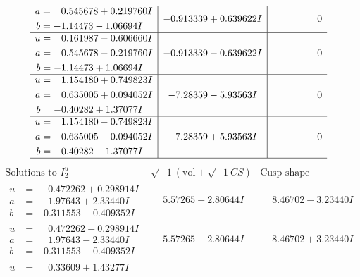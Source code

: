\documentclass[1p]{elsarticle_modified}
\theoremstyle{definition}
\newcommand{\I}{\sqrt{-1}}
\begin{document}
$$\begin{array}{c|c|c}
\begin{aligned}
a &= \phantom{-}0.545678 + 0.219760 I \\
b &= -1.14473 - 1.06694 I\end{aligned}
 & -0.913339 + 0.639622 I & \phantom{-0.000000 } 0 \\ \hline\begin{aligned}
u &= \phantom{-}0.161987 - 0.606660 I \\
a &= \phantom{-}0.545678 - 0.219760 I \\
b &= -1.14473 + 1.06694 I\end{aligned}
 & -0.913339 - 0.639622 I & \phantom{-0.000000 } 0 \\ \hline\begin{aligned}
u &= \phantom{-}1.154180 + 0.749823 I \\
a &= \phantom{-}0.635005 + 0.094052 I \\
b &= -0.40282 + 1.37077 I\end{aligned}
 & -7.28359 - 5.93563 I & \phantom{-0.000000 } 0 \\ \hline\begin{aligned}
u &= \phantom{-}1.154180 - 0.749823 I \\
a &= \phantom{-}0.635005 - 0.094052 I \\
b &= -0.40282 - 1.37077 I\end{aligned}
 & -7.28359 + 5.93563 I & \phantom{-0.000000 } 0\\
 \hline 
 \end{array}$$\newpage$$\begin{array}{c|c|c}  
\text{Solutions to }I^u_{2}& \I (\text{vol} + \sqrt{-1}CS) & \text{Cusp shape}\\
 \hline 
\begin{aligned}
u &= \phantom{-}0.472262 + 0.298914 I \\
a &= \phantom{-}1.97643 + 2.33440 I \\
b &= -0.311553 - 0.409352 I\end{aligned}
 & \phantom{-}5.57265 + 2.80644 I & \phantom{-}8.46702 - 3.23440 I \\ \hline\begin{aligned}
u &= \phantom{-}0.472262 - 0.298914 I \\
a &= \phantom{-}1.97643 - 2.33440 I \\
b &= -0.311553 + 0.409352 I\end{aligned}
 & \phantom{-}5.57265 - 2.80644 I & \phantom{-}8.46702 + 3.23440 I \\ \hline\begin{aligned}
u &= \phantom{-}0.33609 + 1.43277 I \\

\end{aligned}
\end{array}$$
\end{document}
